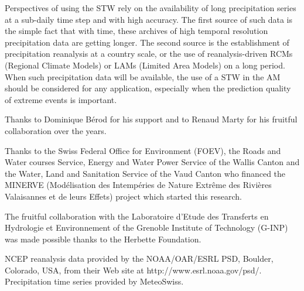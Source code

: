 \documentclass[hess]{copernicus}
\begin{document}
Perspectives of using the STW rely on the availability of long precipitation series at a sub-daily time step and with high accuracy. The first source of such data is the simple fact that with time, these archives of high temporal resolution precipitation data are getting longer. The second source is the establishment of precipitation reanalysis at a country scale, or the use of reanalysis-driven RCMs (Regional Climate Models) or LAMs (Limited Area Models) on a long period. When such precipitation data will be available, the use of a STW in the AM should be considered for any application, especially when the prediction quality of extreme events is important.



\begin{acknowledgements}
Thanks to Dominique B\'{e}rod for his support and to Renaud Marty for his fruitful collaboration over the years. 

Thanks to the Swiss Federal Office for Environment (FOEV), the Roads and Water courses Service, Energy and Water Power Service of the Wallis Canton and the Water, Land and Sanitation Service of the Vaud Canton who financed the MINERVE (Mod\'{e}lisation des Intemp\'{e}ries de Nature Extr\^{e}me des Rivi\`{e}res Valaisannes et de leurs Effets) project which started this research. 

The fruitful collaboration with the Laboratoire d'Etude des Transferts en Hydrologie et Environnement of the Grenoble Institute of Technology (G-INP) was made possible thanks to the Herbette Foundation. 

NCEP reanalysis data provided by the NOAA/OAR/ESRL PSD, Boulder, Colorado, USA, from their Web site at http://www.esrl.noaa.gov/psd/. Precipitation time series provided by MeteoSwiss. 
\end{acknowledgements}









\end{document}
